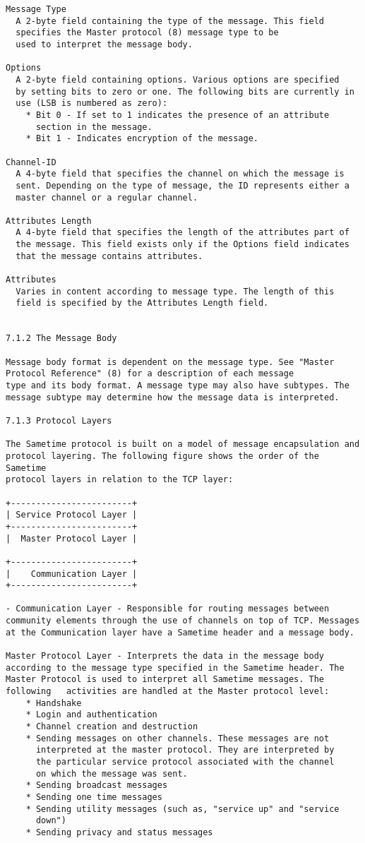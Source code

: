 \documentclass[titlepage,oneside]{book}
\begin{document}
\begin{verbatim}
Message Type
  A 2-byte field containing the type of the message. This field
  specifies the Master protocol (8) message type to be
  used to interpret the message body.

Options
  A 2-byte field containing options. Various options are specified
  by setting bits to zero or one. The following bits are currently in
  use (LSB is numbered as zero):
    * Bit 0 - If set to 1 indicates the presence of an attribute
      section in the message.
    * Bit 1 - Indicates encryption of the message.

Channel-ID
  A 4-byte field that specifies the channel on which the message is
  sent. Depending on the type of message, the ID represents either a
  master channel or a regular channel.

Attributes Length
  A 4-byte field that specifies the length of the attributes part of
  the message. This field exists only if the Options field indicates
  that the message contains attributes.

Attributes
  Varies in content according to message type. The length of this
  field is specified by the Attributes Length field.


7.1.2 The Message Body

Message body format is dependent on the message type. See "Master
Protocol Reference" (8) for a description of each message
type and its body format. A message type may also have subtypes. The
message subtype may determine how the message data is interpreted.

7.1.3 Protocol Layers

The Sametime protocol is built on a model of message encapsulation and
protocol layering. The following figure shows the order of the Sametime
protocol layers in relation to the TCP layer:

+------------------------+
| Service Protocol Layer |
+------------------------+
|  Master Protocol Layer |

+------------------------+
|    Communication Layer |
+------------------------+

- Communication Layer - Responsible for routing messages between
community elements through the use of channels on top of TCP. Messages
at the Communication layer have a Sametime header and a message body.

Master Protocol Layer - Interprets the data in the message body
according to the message type specified in the Sametime header. The
Master Protocol is used to interpret all Sametime messages. The
following   activities are handled at the Master protocol level:
    * Handshake
    * Login and authentication
    * Channel creation and destruction
    * Sending messages on other channels. These messages are not
      interpreted at the master protocol. They are interpreted by
      the particular service protocol associated with the channel
      on which the message was sent.
    * Sending broadcast messages
    * Sending one time messages
    * Sending utility messages (such as, "service up" and "service
      down")
    * Sending privacy and status messages


\end{verbatim}
\end{document}
